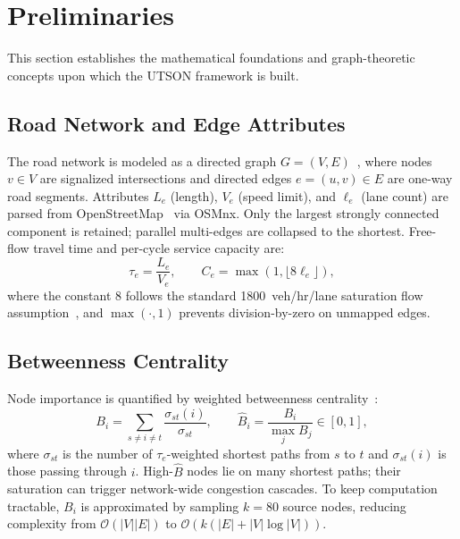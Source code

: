 \documentclass[letterpaper, conference]{IEEEtran}
\begin{document}
\section{Preliminaries}
\label{section_preliminaries}

This section establishes the mathematical foundations and graph-theoretic concepts upon which the UTSON framework is built.

\subsection{Road Network and Edge Attributes}
The road network is modeled as a directed graph $G=(V,E)$~\cite{newman2010networks}, where nodes $v\in V$ are signalized intersections and directed edges $e=(u,v)\in E$ are one-way road segments. Attributes $L_e$ (length), $V_e$ (speed limit), and $\ell_e$ (lane count) are parsed from OpenStreetMap~\cite{boeing2017osmnx} via OSMnx. Only the largest strongly connected component is retained; parallel multi-edges are collapsed to the shortest. Free-flow travel time and per-cycle service capacity are:
\begin{equation}
\tau_e = \frac{L_e}{V_e}, \qquad
C_e = \max\!\left(1,\lfloor 8\ell_e\rfloor\right), \label{eq:tau_cap}
\end{equation}
where the constant $8$ follows the standard 1800~veh/hr/lane saturation flow assumption~\cite{hcm2016}, and $\max(\cdot,1)$ prevents division-by-zero on unmapped edges.

\subsection{Betweenness Centrality}
Node importance is quantified by weighted betweenness centrality~\cite{freeman1977set,brandes2001centrality}:
\begin{equation}
B_i = \sum_{s\neq i\neq t}\frac{\sigma_{st}(i)}{\sigma_{st}}, \qquad
\hat{B}_i = \frac{B_i}{\max_j B_j}\in[0,1], \label{eq:bc}
\end{equation}
where $\sigma_{st}$ is the number of $\tau_e$-weighted shortest paths from $s$ to $t$ and $\sigma_{st}(i)$ is those passing through $i$. High-$\hat{B}$ nodes lie on many shortest paths; their saturation can trigger network-wide congestion cascades. To keep computation tractable, $B_i$ is approximated by sampling $k{=}80$ source nodes, reducing complexity from $\mathcal{O}(|V||E|)$ to $\mathcal{O}(k(|E|+|V|\log|V|))$.
\end{document}
